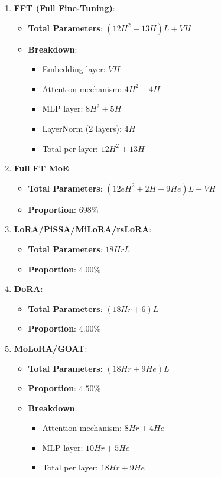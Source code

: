 \begin{enumerate}
    \item \textbf{FFT (Full Fine-Tuning)}:
    \begin{itemize}
        \item \textbf{Total Parameters}: \( (12H^2 + 13H)L + VH \)
        \item \textbf{Breakdown}:
        \begin{itemize}
            \item Embedding layer: \( VH \)
            \item Attention mechanism: \( 4H^2 + 4H \)
            \item MLP layer: \( 8H^2 + 5H \)
            \item LayerNorm (2 layers): \( 4H \)
            \item Total per layer: \( 12H^2 + 13H \)
        \end{itemize}
    \end{itemize}
    \item \textbf{Full FT MoE}:
    \begin{itemize}
        \item \textbf{Total Parameters}: \( (12eH^2+2H+9He)L+VH \)
        \item \textbf{Proportion}: \( 698\% \)
    \end{itemize}
    \item \textbf{LoRA/PiSSA/MiLoRA/rsLoRA}:
    \begin{itemize}
        \item \textbf{Total Parameters}: \( 18HrL \)
        \item \textbf{Proportion}: \( 4.00\% \)
    \end{itemize}

    \item \textbf{DoRA}:
    \begin{itemize}
        \item \textbf{Total Parameters}: \( (18Hr + 6)L \)
        \item \textbf{Proportion}: \( 4.00\% \)
    \end{itemize}

    \item \textbf{MoLoRA/GOAT}:
    \begin{itemize}
        \item \textbf{Total Parameters}: \( (18Hr + 9He)L \)
        \item \textbf{Proportion}: \( 4.50\% \)
        \item \textbf{Breakdown}:
        \begin{itemize}
            \item Attention mechanism: \( 8Hr + 4He \)
            \item MLP layer: \( 10Hr + 5He \)
            \item Total per layer: \( 18Hr + 9He \)
        \end{itemize}
    \end{itemize}


\end{enumerate}
